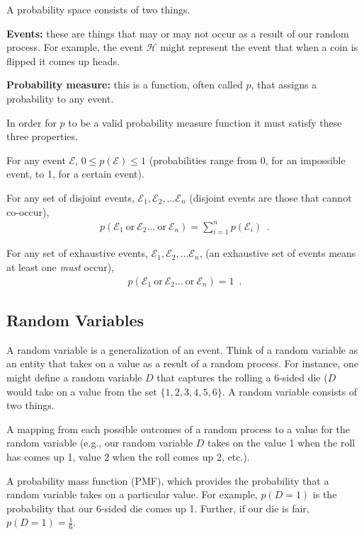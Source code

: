 \documentclass{tufte-handout}
\begin{document}
A probability space consists of two things.
\bi
\item \textbf{Events:} these are things that may or may not occur as a result of our random process.  For example, the event $\mathcal{H}$ might represent the event that when a coin is flipped it comes up heads.
\item \textbf{Probability measure:} this is a function, often called $p$, that assigns a probability to any event.
\ei

In order for $p$ to be a valid probability measure function it must satisfy these three properties.
\be
\item For any event $\mathcal{E}$, $0 \leq p(\mathcal{E}) \leq 1$ (probabilities range from 0, for an impossible event, to 1, for a certain event).
\item For any set of disjoint events, $\mathcal{E}_1, \mathcal{E}_2, \ldots \mathcal{E}_n$ (disjoint events are those that cannot co-occur),
\begin{align}
p(\mathcal{E}_1~\mbox{or}~\mathcal{E}_2 \ldots ~\mbox{or}~\mathcal{E}_n) = \sum_{i=1}^n p(\mathcal{E}_i) \enspace .
\end{align}
\item For any set of exhaustive events, $\mathcal{E}_1, \mathcal{E}_2, \ldots \mathcal{E}_n$, (an exhaustive set of events means at least one \emph{must} occur),
\begin{align}
p(\mathcal{E}_1~\mbox{or}~\mathcal{E}_2 \ldots ~\mbox{or}~\mathcal{E}_n) = 1 \enspace .
\end{align}

\ee

\subsection{Random Variables}
A random variable is a generalization of an event.  Think of a random variable as an entity that takes on a value as a result of a random process.  For instance, one might define a random variable $D$ that captures the rolling a 6-sided die ($D$ would take on a value from the set $\{1, 2, 3, 4, 5, 6\}$.  A random variable consists of two things.
\bi
\item A mapping from each possible outcomes of a random process to a value for the random variable (e.g., our random variable $D$ takes on the value 1 when the roll has comes up 1, value 2 when the roll comes up 2, etc.).
\item A probability mass function (PMF), which provides the probability that a random variable takes on a particular value.  For example, $p(D = 1)$ is the probability that our 6-sided die comes up 1.  Further, if our die is fair, $p(D=1)=\frac{1}{6}$.
\ei
\end{document}

